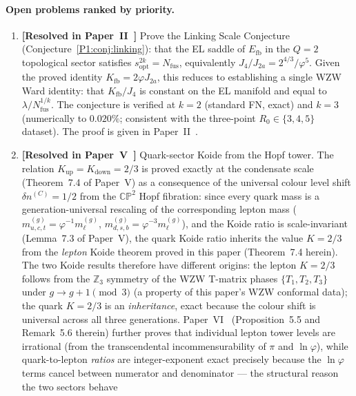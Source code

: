 \documentclass[11pt,a4paper]{article}
\theoremstyle{definition}
\theoremstyle{remark}
\newcommand{\vp}{\varphi}
\newcommand{\lam}{\lambda}
\newcommand{\Kfb}{K_{\mathrm{fb}}}
\newcommand{\Efb}{E_{\mathrm{fb}}}
\newcommand{\Ja}{J_{2a}}
\newcommand{\Jfour}{J_{4}}
\newcommand{\sopt}{s_{\mathrm{opt}}}
\begin{document}
\paragraph{Open problems ranked by priority.}
\begin{enumerate}[noitemsep]
  \item \textbf{[Resolved in Paper~II~\cite{Paper2}]} Prove the Linking Scale Conjecture
    (Conjecture~\ref{P1:conj:linking}): that the EL saddle of $\Efb$
    in the $Q=2$ topological sector satisfies $\sopt^{2k}=N_{\mathrm{fus}}$,
    equivalently $\Jfour/\Ja = 2^{4/3}/\vp^5$.
    Given the proved identity $\Kfb=2\vp\Ja$, this reduces to
    establishing a single WZW Ward identity: that $\Kfb/\Jfour$
    is constant on the EL manifold and equal to $\lam/N_{\mathrm{fus}}^{1/k}$.
    The conjecture is verified at $k=2$ (standard FN, exact) and
    $k=3$ (numerically to $0.020\%$; consistent with the
    three-point $R_0\in\{3,4,5\}$ dataset).
    The proof is given in Paper~II~\cite{Paper2}.
    \item \textbf{[Resolved in Paper~V~\cite{Paper5}]}
      Quark-sector Koide from the Hopf tower.
      The relation $K_{\mathrm{up}}=K_{\mathrm{down}}=2/3$ is proved exactly
      at the condensate scale (Theorem~7.4 of Paper~V) as a consequence of
      the universal colour level shift $\delta n^{(C)}=1/2$ from the
      $\mathbb{CP}^2$ Hopf fibration: since every quark mass is a
      generation-universal rescaling of the corresponding lepton mass
      ($m_{u,c,t}^{(g)}=\vp^{-1}m_{\ell}^{(g)}$,
       $m_{d,s,b}^{(g)}=\vp^{-3}m_{\ell}^{(g)}$),
      and the Koide ratio is scale-invariant
      (Lemma~7.3 of Paper~V), the quark Koide ratio inherits the value
      $K=2/3$ from the \emph{lepton} Koide theorem proved in this paper
      (Theorem~7.4 herein).
      The two Koide results therefore have different origins:
      the lepton $K=2/3$ follows from the $\mathbb{Z}_3$ symmetry of the
      WZW T-matrix phases $\{T_1,T_2,T_3\}$ under $g\to g+1\pmod{3}$
      (a property of this paper's WZW conformal data);
      the quark $K=2/3$ is an \emph{inheritance}, exact because the
      colour shift is universal across all three generations.
      Paper~VI~\cite{Paper6} (Proposition~5.5 and Remark~5.6 therein)
      further proves that individual lepton tower levels are irrational
      (from the transcendental incommensurability of $\pi$ and $\ln\vp$),
      while quark-to-lepton \emph{ratios} are integer-exponent exact
      precisely because the $\ln\vp$ terms cancel between numerator and
      denominator --- the structural reason the two sectors behave

\end{enumerate}
\end{document}
